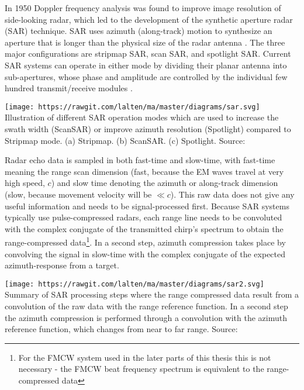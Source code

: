 In 1950 Doppler frequency analysis was found to improve image resolution
of side-looking radar, which led to the development of the synthetic
aperture radar (SAR) technique. SAR uses azimuth (along-track) motion to
synthesize an aperture that is longer than the physical size of the
radar antenna \cite{Wang2008}. The three major configurations are
stripmap SAR, scan SAR, and spotlight SAR. Current SAR systems can
operate in either mode by dividing their planar antenna into
sub-apertures, whose phase and amplitude are controlled by the
individual few hundred transmit/receive modules \cite{Moreira2013}.

\texttt{[image: https://rawgit.com/lalten/ma/master/diagrams/sar.svg]}
Illustration of different SAR operation modes which are used to increase
the swath width (ScanSAR) or improve azimuth resolution (Spotlight)
compared to Stripmap mode. (a) Stripmap. (b) ScanSAR. (c) Spotlight.
Source: \cite{Moreira2013}

Radar echo data is sampled in both fast-time and slow-time, with
fast-time meaning the range scan dimension (fast, because the EM waves
travel at very high speed, \(c\)) and slow time denoting the azimuth or
along-track dimension (slow, because movement velocity will be
\(\ll c\)). This raw data does not give any useful information and needs
to be signal-processed first. Because SAR systems typically use
pulse-compressed radars, each range line needs to be convoluted with the
complex conjugate of the transmitted chirp's spectrum to obtain the
range-compressed
data\footnote{For the FMCW system used in the later parts of this thesis this is not necessary - the FMCW beat frequency spectrum is equivalent to the range-compressed data}.
In a second step, azimuth compression takes place by convolving the
signal in slow-time with the complex conjugate of the expected
azimuth-response from a target.

\texttt{[image: https://rawgit.com/lalten/ma/master/diagrams/sar2.svg]}
Summary of SAR processing steps where the range compressed data result
from a convolution of the raw data with the range reference function. In
a second step the azimuth compression is performed through a convolution
with the azimuth reference function, which changes from near to far
range. Source: \cite{Moreira2013}

